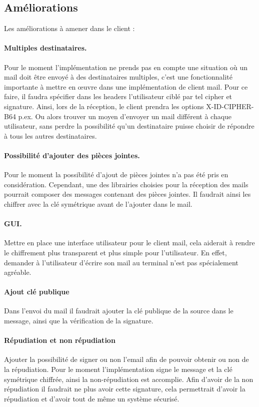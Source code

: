 \subsection{Améliorations}
Les améliorations à amener dans le client :
\paragraph*{Multiples destinataires.}
Pour le moment l'implémentation ne prends pas en compte une situation où un mail doit être envoyé à des destinataires multiples, c'est une fonctionnalité importante à mettre en œuvre dans une implémentation de client mail. Pour ce faire, il faudra spécifier dans les headers l'utilisateur ciblé par tel cipher et signature. Ainsi, lors de la réception, le client prendra les options X-ID-CIPHER-B64 p.ex. Ou alors trouver un moyen d'envoyer un mail différent à chaque utilisateur, sans perdre la possibilité qu'un destinataire puisse choisir de répondre à tous les autres destinataires.
\paragraph*{Possibilité d'ajouter des pièces jointes.}
Pour le moment la possibilité d'ajout de pièces jointes n'a pas été pris en considération. Cependant, une des librairies choisies pour la réception des mails pourrait composer des messages contenant des pièces jointes. Il faudrait ainsi les chiffrer avec la clé symétrique avant de l'ajouter dans le mail.
\paragraph*{GUI.}
Mettre en place une interface utilisateur pour le client mail, cela aiderait à rendre le chiffrement plus transparent et plus simple pour l'utilisateur. En effet, demander à l'utilisateur d'écrire son mail au terminal n'est pas spécialement agréable.
\paragraph*{Ajout clé publique}
Dans l'envoi du mail il faudrait ajouter la clé publique de la source dans le message, ainsi que la vérification de la signature.

\paragraph*{Répudiation et non répudiation}
Ajouter la possibilité de signer ou non l'email afin de pouvoir obtenir ou non de la répudiation. Pour le moment l'implémentation signe le message et la clé symétrique chiffrée, ainsi la non-répudiation est accomplie. Afin d'avoir de la non répudiation il faudrait ne plus avoir cette signature, cela permettrait d'avoir la répudiation et d'avoir tout de même un système sécurisé.

